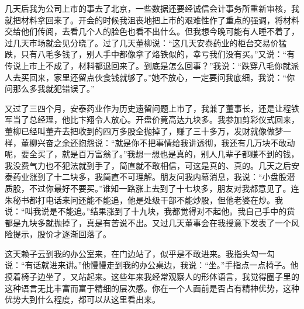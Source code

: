 \documentclass[12pt,oneside]{book}
\begin{document}
几天后我为公司上市的事去了北京，一些数据还要经诚信会计事务所重新审核，我就把材料拿回来了。开会的时候我沮丧地把上市的艰难性作了重点的强调，将材料交给他们传阅，去看几个人的脸色也看不出什么。但我想今晚可能有人睡不着了，过几天市场就会见分晓了。过了几天董柳说：``这几天安泰药业的柜台交易价猛跌，只有八毛多钱了，别人手中都像拿了烙铁似的，幸亏我们没有买。''又说：``有传说上市上不成了，材料都退回来了。到底是怎么回事？''我说：``跌穿八毛你就派人去买回来，家里还留点伙食钱就够了。''她不放心，一定要问我底细，我说：``你问那么多我就犯错误了。''

又过了三四个月，安泰药业作为历史遗留问题上市了，我兼了董事长，还是让程铁军当了总经理，他比卞翔令人放心。开盘价竟高达九块多。我参加剪彩仪式回来，董柳已经叫董卉去把收到的四万多股全抛掉了，赚了三十多万，发财就像做梦一样，董柳兴奋之余还抱怨说：``就是你不把事情给我讲透彻，我还有几万块不敢动呢，要全买了，就是百万富翁了。''我想一想也是真的，别人几辈子都赚不到的钱，我没费气力也不犯法就到手了，简直就不敢相信，可这是真的、真的。几天之后安泰药业涨到了十二块多，我简直不可理解。朋友问我内幕消息，我说：``小盘股潜质股，不过你最好不要买。''谁知一路涨上去到了十七块多，朋友对我都意见了。连朱秘书都打电话来问还能不能追，他是处级干部不能炒股，但他老婆在炒。我说：``叫我说是不能追。''结果涨到了十九块，我都觉得对不起他。我自己手中的货都是九块多就抛掉了，真是有苦说不出。又过几天董事会在我授意下发表了一个风险提示，股价才逐渐回落了。

这天赖子云到我的办公室来，在门边站了，似乎是不敢进来。我指头勾一勾说：``有话就进来讲。''他慢慢走到我的办公桌边，我说：``坐。''手指点一点椅子。他摸着椅子边坐了，又站起来。这些年来我经常观察人的形体语言，我觉得圈子里的这种语言无比丰富而富于精细的层次感。你在一个人面前是否占有精神优势，这种优势大到什么程度，都可以从这里看出来。
\end{document}
